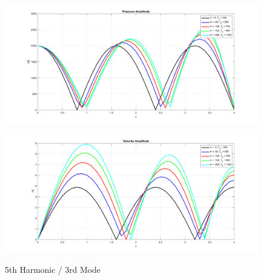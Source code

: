 \documentclass[8pt]{article} %
\begin{document}
\begin{figure}[H]
  \centering
  \begin{minipage}[b]{0.495\linewidth}
    \centering
    \includegraphics[width=\linewidth]{pvsx3}
    \label{fig:pvsx3}
  \end{minipage}
  \hfill
  \begin{minipage}[b]{0.495\linewidth}
    \centering
    \includegraphics[width=\linewidth]{vvsx3}
    \label{fig:vvsx3}
  \end{minipage}
\caption{5th Harmonic / 3rd Mode}
\end{figure}
\end{document}
